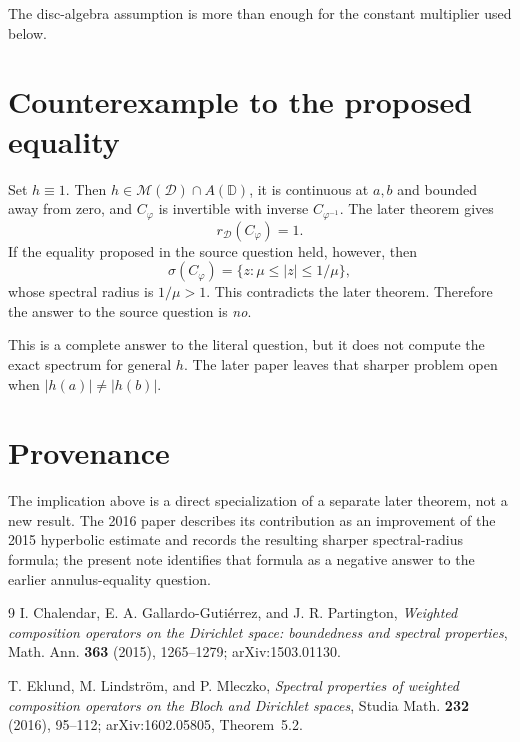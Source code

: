 \documentclass[11pt]{article}
\begin{document}
The disc-algebra assumption is more than enough for the constant multiplier
used below.

\section{Counterexample to the proposed equality}

Set $h\equiv1$.  Then $h\in\mathcal M(\mathcal D)\cap A(\mathbb D)$, it is
continuous at $a,b$ and bounded away from zero, and $C_\varphi$ is invertible
with inverse $C_{\varphi^{-1}}$.  The later theorem gives
\[
 r_{\mathcal D}(C_\varphi)=1.
\]
If the equality proposed in the source question held, however, then
\[
 \sigma(C_\varphi)=\{z:\mu\le |z|\le1/\mu\},
\]
whose spectral radius is $1/\mu>1$.  This contradicts the later theorem.
Therefore the answer to the source question is \emph{no}.

This is a complete answer to the literal question, but it does not compute
the exact spectrum for general $h$.  The later paper leaves that sharper
problem open when $|h(a)|\ne|h(b)|$.

\section{Provenance}

The implication above is a direct specialization of a separate later
theorem, not a new result.  The 2016 paper describes its contribution as an
improvement of the 2015 hyperbolic estimate and records the resulting sharper
spectral-radius formula; the present note identifies that formula as a
negative answer to the earlier annulus-equality question.

\begin{thebibliography}{9}
I. Chalendar, E. A. Gallardo-Guti\'errez, and J. R. Partington,
\emph{Weighted composition operators on the Dirichlet space: boundedness and
spectral properties}, Math. Ann. \textbf{363} (2015), 1265--1279;
arXiv:1503.01130.

T. Eklund, M. Lindstr\"om, and P. Mleczko,
\emph{Spectral properties of weighted composition operators on the Bloch and
Dirichlet spaces}, Studia Math. \textbf{232} (2016), 95--112;
arXiv:1602.05805, Theorem~5.2.
\end{thebibliography}
\end{document}

